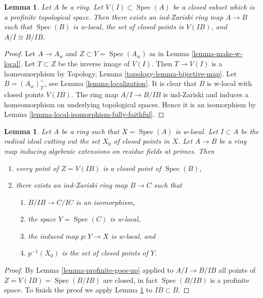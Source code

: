 \documentclass{stacks-project}
\theoremstyle{plain}
\newtheorem{lemma}[subsection]{Lemma}
\theoremstyle{definition}
\theoremstyle{remark}
\numberwithin{equation}{subsection}
\def\Spec{\mathop{\mathrm{Spec}}}
\begin{document}
\begin{lemma}
\label{lemma-localize-along-closed-profinite}
Let $A$ be a ring. Let $V(I) \subset \Spec(A)$ be a closed subset
which is a profinite topological space. Then there exists an
ind-Zariski ring map $A \to B$ such that $\Spec(B)$ is w-local,
the set of closed points is $V(IB)$, and $A/I \cong B/IB$.
\end{lemma}

\begin{proof}
Let $A \to A_w$ and $Z \subset Y = \Spec(A_w)$ as in
Lemma \ref{lemma-make-w-local}.
Let $T \subset Z$ be the inverse image of $V(I)$.
Then $T \to V(I)$ is a homeomorphism by
Topology, Lemma \ref{topology-lemma-bijective-map}.
Let $B = (A_w)_T^\sim$, see Lemma \ref{lemma-localization}.
It is clear that $B$ is w-local with closed points $V(IB)$.
The ring map $A/I \to B/IB$ is ind-Zariski
and induces a homeomorphism on underlying
topological spaces. Hence it is an isomorphism by
Lemma \ref{lemma-local-isomorphism-fully-faithful}.
\end{proof}

\begin{lemma}
\label{lemma-w-local-algebraic-residue-field-extensions}
Let $A$ be a ring such that $X = \Spec(A)$ is w-local. Let $I \subset A$
be the radical ideal cutting out the set $X_0$ of closed points in $X$.
Let $A \to B$ be a ring map inducing algebraic extensions on residue
fields at primes. Then
\begin{enumerate}
\item every point of $Z = V(IB)$ is a closed point of $\Spec(B)$,
\item there exists an ind-Zariski ring map $B \to C$ such that
\begin{enumerate}
\item $B/IB \to C/IC$ is an isomorphism,
\item the space $Y = \Spec(C)$ is w-local,
\item the induced map $p : Y \to X$ is w-local, and
\item $p^{-1}(X_0)$ is the set of closed points of $Y$.
\end{enumerate}
\end{enumerate}
\end{lemma}

\begin{proof}
By Lemma \ref{lemma-profinite-goes-up} applied to $A/I \to B/IB$
all points of $Z = V(IB) = \Spec(B/IB)$ are closed, in fact $\Spec(B/IB)$
is a profinite space.
To finish the proof we apply Lemma \ref{lemma-localize-along-closed-profinite}
to $IB \subset B$.
\end{proof}
\end{document}

